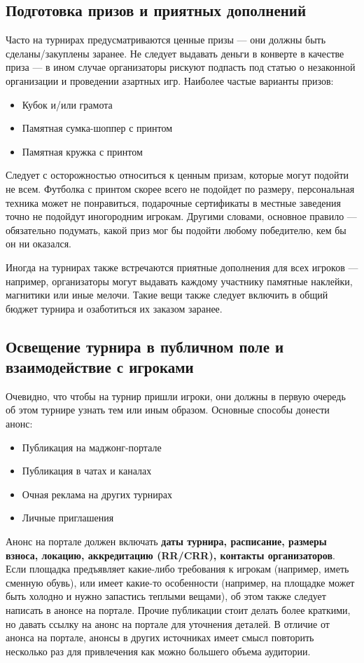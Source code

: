 \subsection{Подготовка призов и приятных дополнений}

Часто на турнирах предусматриваются ценные призы --- они должны быть сделаны/закуплены заранее. Не следует выдавать деньги в конверте в качестве приза --- в ином случае организаторы рискуют подпасть под статью о незаконной организации и проведении азартных игр. Наиболее частые варианты призов:
\begin{itemize}
	\item Кубок и/или грамота
	\item Памятная сумка-шоппер с принтом
	\item Памятная кружка с принтом
\end{itemize}

Следует с осторожностью относиться к ценным призам, которые могут подойти не всем. Футболка с принтом скорее всего не подойдет по размеру, персональная техника может не понравиться, подарочные сертификаты в местные заведения точно не подойдут иногородним игрокам. Другими словами, основное правило --- обязательно подумать, какой приз мог бы подойти любому победителю, кем бы он ни оказался.

Иногда на турнирах также встречаются приятные дополнения для всех игроков --- например, организаторы могут выдавать каждому участнику памятные наклейки, магнитики или иные мелочи. Такие вещи также следует включить в общий бюджет турнира и озаботиться их заказом заранее.

\subsection{Освещение турнира в публичном поле и взаимодействие с игроками}

Очевидно, что чтобы на турнир пришли игроки, они должны в первую очередь об этом турнире узнать тем или иным образом. Основные способы донести анонс:
\begin{itemize}
	\item Публикация на маджонг-портале
	\item Публикация в чатах и каналах
	\item Очная реклама на других турнирах
	\item Личные приглашения
\end{itemize}

Анонс на портале должен включать \textbf{даты турнира, расписание, размеры взноса, локацию, аккредитацию (RR/CRR), контакты организаторов}. Если площадка предъявляет какие-либо требования к игрокам (например, иметь сменную обувь), или имеет какие-то особенности (например, на площадке может быть холодно и нужно запастись теплыми вещами), об этом также следует написать в анонсе на портале. Прочие публикации стоит делать более краткими, но давать ссылку на анонс на портале для уточнения деталей. В отличие от анонса на портале, анонсы в других источниках имеет смысл повторить несколько раз для привлечения как можно большего объема аудитории.

